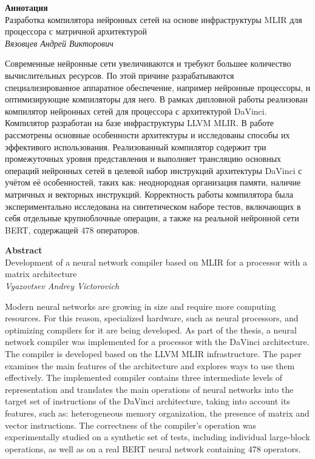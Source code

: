 \begin{center}
\textbf{Аннотация} \\[0.3 cm]
Разработка компилятора нейронных сетей на основе инфраструктуры MLIR для процессора с матричной архитектурой \\
\textit{Вязовцев Андрей Викторович} \\[1 cm]
\end{center}

Современные нейронные сети увеличиваются и требуют большее количество
вычислительных ресурсов. По этой причине разрабатываются специализированное
аппаратное обеспечение, например нейронные процессоры, и оптимизирующие
компиляторы для него. В рамках дипловной работы реализован компилятор нейронных
сетей для процессора с архитектурой DaVinci. Компилятор разработан на базе
инфраструктуры LLVM MLIR. В работе рассмотрены
основные особенности архитектуры и исследованы способы их эффективого
использования. Реализованный компилятор содержит три промежуточных уровня
представления и выполняет трансляцию основных операций
нейронных сетей в целевой набор инструкций архитектуры DaVinci с учётом её
особенностей, таких как: неоднородная организация памяти, наличие матричных и векторных
инструкций. Корректность работы компилятора была экспериментально исследована на
синтетическом наборе тестов, включающих в себя отдельные крупноблочные операции,
а также на реальной нейронной сети BERT, содержащей 478 операторов. \\[1 cm]

\newpage

\begin{center}
    \textbf{Abstract} \\[0.3 cm]
    Development of a neural network compiler based on MLIR for a processor with a matrix architecture \\
    \textit{Vyazovtsev Andrey Victorovich} \\[1 cm]
\end{center}

Modern neural networks are growing in size and require more computing resources.
For this reason, specialized hardware, such as neural processors, and optimizing
compilers for it are being developed. As part of the thesis, a neural network
compiler was implemented for a processor with the DaVinci architecture. The
compiler is developed based on the LLVM MLIR infrastructure. The paper examines
the main features of the architecture and explores ways to use them effectively.
The implemented compiler contains three intermediate levels of representation
and translates the main operations of neural networks into the target set of
instructions of the DaVinci architecture, taking into account its features, such
as: heterogeneous memory organization, the presence of matrix and vector
instructions. The correctness of the compiler's operation was experimentally
studied on a synthetic set of tests, including individual large-block
operations, as well as on a real BERT neural network containing 478 operators.

\newpage